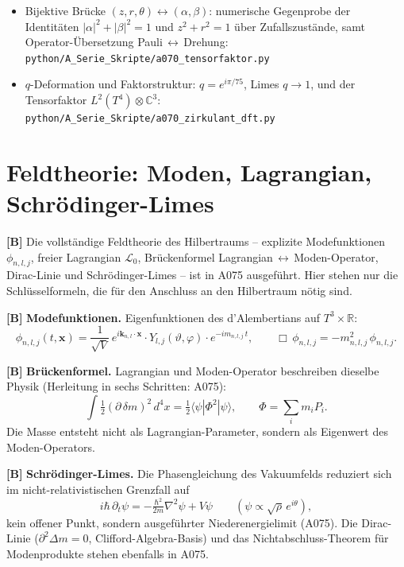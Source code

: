 \begin{itemize}[leftmargin=2em,itemsep=2pt,topsep=2pt]
  \item Bijektive Brücke $(z,r,\theta)\leftrightarrow(\alpha,\beta)$: numerische
    Gegenprobe der Identitäten $|\alpha|^2+|\beta|^2=1$ und $z^2+r^2=1$ über
    Zufallszustände, samt Operator-Übersetzung Pauli\,$\leftrightarrow$\,Drehung:
    \texttt{python/A\_Serie\_Skripte/a070\_tensorfaktor.py}
  \item $q$-Deformation und Faktorstruktur: $q = e^{i\pi/75}$, Limes $q\to1$,
    und der Tensorfaktor $L^2(T^4)\otimes\mathbb{C}^3$:
    \texttt{python/A\_Serie\_Skripte/a070\_zirkulant\_dft.py}
\end{itemize}

\section{Feldtheorie: Moden, Lagrangian, Schrödinger-Limes}

\textbf{[B]} Die vollständige Feldtheorie des Hilbertraums -- explizite
Modefunktionen $\phi_{n,l,j}$, freier Lagrangian $\mathcal L_0$, Brückenformel
Lagrangian\,$\leftrightarrow$\,Moden-Operator, Dirac-Linie und Schrödinger-Limes
-- ist in A075 ausgeführt. Hier stehen nur die Schlüsselformeln, die für den
Anschluss an den Hilbertraum nötig sind.

\textbf{[B]} \textbf{Modefunktionen.} Eigenfunktionen des d'Alembertians auf
$T^3\times\mathbb R$:
\[
  \phi_{n,l,j}(t,\mathbf x)
  = \frac{1}{\sqrt V}\,
    e^{i\mathbf k_{n,l}\cdot\mathbf x}\cdot
    Y_{l,j}(\vartheta,\varphi)\cdot
    e^{-im_{n,l,j}\,t},
  \qquad \Box\,\phi_{n,l,j} = -m_{n,l,j}^2\,\phi_{n,l,j}.
\]

\textbf{[B]} \textbf{Brückenformel.} Lagrangian und Moden-Operator beschreiben
dieselbe Physik (Herleitung in sechs Schritten: A075):
\[
  \int\tfrac12(\partial\,\delta m)^2\,d^4x
  = \tfrac12\langle\psi|\Phi^2|\psi\rangle,
  \qquad \Phi = \sum_i m_i P_i.
\]
Die Masse entsteht nicht als Lagrangian-Parameter, sondern als Eigenwert des
Moden-Operators.

\textbf{[B]} \textbf{Schrödinger-Limes.} Die Phasengleichung des Vakuumfelds
reduziert sich im nicht-relativistischen Grenzfall auf
\[
  i\hbar\,\partial_t\psi = -\tfrac{\hbar^2}{2m}\nabla^2\psi + V\psi
  \qquad (\psi\propto\sqrt\rho\,e^{i\theta}),
\]
kein offener Punkt, sondern ausgeführter Niederenergielimit (A075). Die Dirac-Linie
($\partial^2\Delta m=0$, Clifford-Algebra-Basis) und das Nichtabschluss-Theorem
für Modenprodukte stehen ebenfalls in A075.


